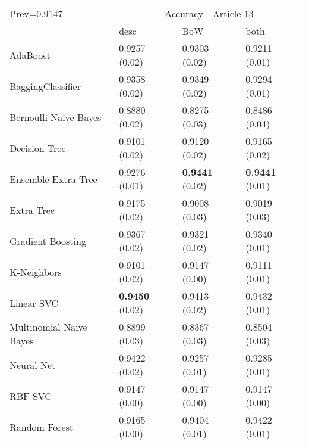 \begin{tabular}{|l|l|l|l| }
\hline
Prev=0.9147 &  \multicolumn{3}{c|}{Accuracy - Article 13} \\
\cline{2-4} & desc & BoW & both \\ \hline
AdaBoost                & 0.9257 (0.02) & 0.9303 (0.02) & 0.9211 (0.01)\\
BaggingClassifier       & 0.9358 (0.02) & 0.9349 (0.02) & 0.9294 (0.01)\\
Bernoulli Naive Bayes   & 0.8880 (0.02) & 0.8275 (0.03) & 0.8486 (0.04)\\
Decision Tree           & 0.9101 (0.02) & 0.9120 (0.02) & 0.9165 (0.02)\\
Ensemble Extra Tree     & 0.9276 (0.01) & {\bf 0.9441} (0.02) & {\bf 0.9441} (0.01)\\
Extra Tree              & 0.9175 (0.02) & 0.9008 (0.03) & 0.9019 (0.03)\\
Gradient Boosting       & 0.9367 (0.02) & 0.9321 (0.02) & 0.9340 (0.01)\\
K-Neighbors             & 0.9101 (0.02) & 0.9147 (0.00) & 0.9111 (0.01)\\
Linear SVC              & {\bf 0.9450} (0.02) & 0.9413 (0.02) & 0.9432 (0.01)\\
Multinomial Naive Bayes & 0.8899 (0.03) & 0.8367 (0.03) & 0.8504 (0.03)\\
Neural Net              & 0.9422 (0.02) & 0.9257 (0.01) & 0.9285 (0.01)\\
RBF SVC                 & 0.9147 (0.00) & 0.9147 (0.00) & 0.9147 (0.00)\\
Random Forest           & 0.9165 (0.00) & 0.9404 (0.01) & 0.9422 (0.01)\\
\hline
\end{tabular}